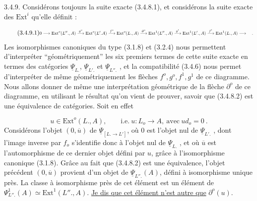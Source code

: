 3.4.9. Considérons toujours la suite exacte (3.4.8.1), et considérons la suite exacte des $\mathrm{Ext}^i$ qu'elle définit :

\begin{equation}\tag{3.4.9.1}
\resizebox{\textwidth}{!}{$\displaystyle
0 \longrightarrow \mathrm{Ext}^o(L''.,A) \stackrel{g^o}{\longrightarrow} \mathrm{Ext}^o(L'.A) \stackrel{f^o}{\longrightarrow} \mathrm{Ext}^o(L.,A) \stackrel{\partial^o}{\longrightarrow} \mathrm{Ext}^1(L''.,A) \stackrel{g^1}{\longrightarrow} \mathrm{Ext}^1(L'.,A) \stackrel{f^1}{\longrightarrow} \mathrm{Ext}^1(L.,A) \longrightarrow \quad .
$}
\end{equation}
Les isomorphismes canoniques du type (3.1.8) et (3.2.4) nous permettent d'interpréter ``géométriquement'' les six premiers termes de cette suite exacte en termes des catégories $\underline{\Psi}_{L.}$, $\underline{\Psi}_{L'.}$ et $\underline{\Psi}_{L''.}$ , et la compatibilité (3.4.6) nous permet d'interpréter de même géométriquement les flèches
$f^o,g^o,f^1,g^1$ de ce diagramme. Nous allons donner de même une interprétation géométrique de la flèche $\partial^o$ de ce diagramme, en utilisant le résultat qu'on vient de prouver, savoir que (3.4.8.2) est une équivalence de catégories. Soit en effet

\begin{equation*}
u \in \mathrm{Ext}^o(L.,A), \qquad \mathrm{i.e.} \ u : L_o \longrightarrow A, \ \mathrm{avec} \ ud_o = 0 \ .
\end{equation*}
Considérons l'objet $(0,\overline{u})$ de $\underline{\Psi}_{[L. \to L']}$, où $0$ est l'objet nul de $\underline{\Psi}_{L'.}$ , dont l'image inverse par $f_o$ s'identifie donc à l'objet nul de $\underline{\Psi}_{L.}$ , et où $\overline{u}$ est l'automorphisme de ce dernier objet défini par $u$, grâce à l'isomorphisme canonique (3.1.8). Grâce au fait que (3.4.8.2) est une équivalence, l'objet précédent $(0,\overline{u})$ provient d'un objet de $\underline{\Psi}_{L''.}(A)$, défini à isomorphisme unique près. La classe à isomorphisme près de cet élément est un élément de $\Psi^1_{L''.}(A) \simeq \mathrm{Ext}^1(L''.,A)$. \underline{Je dis que cet élément n'est autre que} $\partial^o(u)$.

